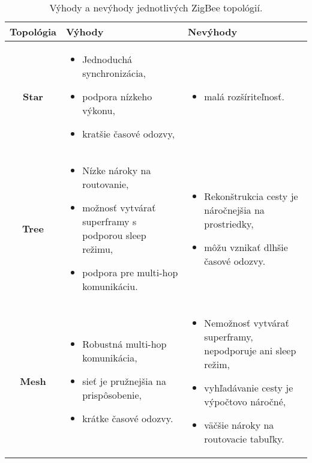\documentclass[12pt,a4paper,oneside,openright]{report}
\begin{document}
\singlespacing
\begin{table}
	\caption{Výhody a nevýhody jednotlivých ZigBee topológií. \cite{zigbeebook}} 
	\label{table:zigbee_arch}
	\begin{tabularx}{\textwidth}{|c|Y|Y|}
		\hline
		\textbf{Topológia} & \textbf{Výhody} & \textbf{Nevýhody} \\
		\hline
		\textbf{Star} & 
		\singlespacing
		\begin{itemize}
			\item Jednoduchá synchronizácia,
			\item podpora nízkeho výkonu,
			\item kratšie časové odozvy,
		\end{itemize}
		&  
		\begin{itemize}
			\item malá rozšíriteľnosť.
		\end{itemize}
		\\
		\hline
		\textbf{Tree} & 
		\begin{itemize}
			\item Nízke nároky na routovanie,
			\item možnosť vytvárať superframy s podporou sleep režimu,
			\item podpora pre multi-hop komunikáciu.
		\end{itemize}
		&
		\begin{itemize}
			\item Rekonštrukcia cesty je náročnejšia na prostriedky,
			\item môžu vznikať dlhšie časové odozvy.
		\end{itemize}
		\\
		\hline
		\textbf{Mesh} &
		\begin{itemize}
			\item Robustná multi-hop komunikácia,
			\item sieť je pružnejšia na prispôsobenie,
			\item krátke časové odozvy.
		\end{itemize} & 
		\begin{itemize}
			\item Nemožnosť vytvárať superframy, nepodporuje ani sleep režim,
			\item vyhľadávanie cesty je výpočtovo náročné,
			\item väčšie nároky na routovacie tabuľky.
		\end{itemize} \\
		\hline
	\end{tabularx}
\end{table}
\onehalfspacing
\end{document}

